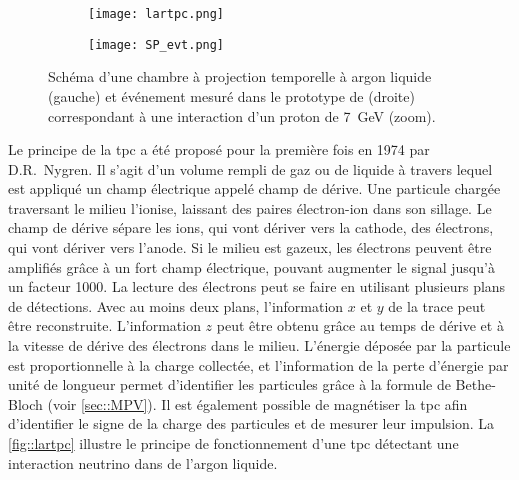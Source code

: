     \begin{figure}[htbp]
      \begin{subfigure}[t]{0.57\textwidth}
        \flushleft
        \centering
        \texttt{[image: lartpc.png]}
      \end{subfigure}
      \begin{subfigure}[t]{0.43\textwidth}
        \flushright
        \centering
        \texttt{[image: SP\_evt.png]}
      \end{subfigure}
      \caption[Schéma d'une chambre à projection temporelle à argon liquide et exemple d'événement vue par \protosp{}.]{\label{fig::lartpc}Schéma d'une chambre à projection temporelle à argon liquide (gauche) et événement mesuré dans le prototype de \protosp{} (droite) correspondant à une interaction d'un proton de \SI{7}{\giga\eV} (zoom).}
    \end{figure}
    Le principe de la \acrfull{tpc} a été proposé pour la première fois en 1974 par D.R.~Nygren\cite{Nygren1974}. Il s'agit d'un volume rempli de gaz ou de liquide à travers lequel est appliqué un champ électrique appelé champ de dérive. Une particule chargée traversant le milieu l'ionise, laissant des paires électron-ion dans son sillage. Le champ de dérive sépare les ions, qui vont dériver vers la cathode, des électrons, qui vont dériver vers l'anode. Si le milieu est gazeux, les électrons peuvent être amplifiés grâce à un fort champ électrique, pouvant augmenter le signal jusqu'à un facteur 1000. La lecture des électrons peut se faire en utilisant plusieurs plans de détections. Avec au moins deux plans, l'information $x$ et $y$ de la trace peut être reconstruite. L'information $z$ peut être obtenu grâce au temps de dérive et à la vitesse de dérive des électrons dans le milieu. L'énergie déposée par la particule est proportionnelle à la charge collectée, et l'information de la perte d'énergie par unité de longueur permet d'identifier les particules grâce à la formule de Bethe-Bloch (voir \autoref{sec::MPV}). Il est également possible de magnétiser la \gls{tpc} afin d'identifier le signe de la charge des particules et de mesurer leur impulsion. La \autoref{fig::lartpc} illustre le principe de fonctionnement d'une \gls{tpc} détectant une interaction neutrino dans de l'argon liquide.

